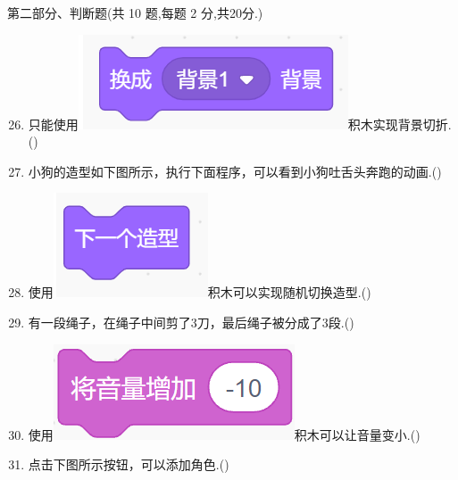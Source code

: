 \documentclass[10pt, a4paper]{article}
\begin{document}
    {\noindent\heiti 第二部分、判断题(共 10 题,每题 2 分,共20分.)}
    \begin{enumerate}
        \setcounter{enumi}{25}
        \item 只能使用\includegraphics[width=.15\textwidth]{26.png}积木实现背景切折.(\qquad)

        \item 小狗的造型如下图所示，执行下面程序，可以看到小狗吐舌头奔跑的动画.(\qquad)
        
        \item 使用\includegraphics[width=.1\textwidth]{28.png}积木可以实现随机切换造型.(\qquad)
  
        \item 有一段绳子，在绳子中间剪了3刀，最后绳子被分成了3段.(\qquad)
        
        \item 使用\includegraphics[width=.15\textwidth]{30.png}积木可以让音量变小.(\qquad)

        \item 点击下图所示按钮，可以添加角色.(\qquad)
        

\end{enumerate}
\end{document}
